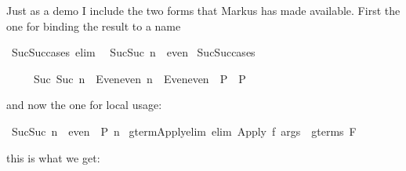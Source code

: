 \begin{isabellebody}
\begin{isamarkuptext}
Just as a demo I include
the two forms that Markus has made available. First the one for binding the
result to a name%
\end{isamarkuptext}%
\isamarkuptrue%
\ Suc{\isacharunderscore}Suc{\isacharunderscore}cases\ {\isacharbrackleft}elim{\isacharbang}{\isacharbrackright}{\isacharcolon}\isanewline
\ \ {\isachardoublequote}Suc{\isacharparenleft}Suc\ n{\isacharparenright}\ {\isasymin}\ even{\isachardoublequote}\isanewline
\isanewline
\isamarkupfalse%
\ Suc{\isacharunderscore}Suc{\isacharunderscore}cases\isamarkupfalse%
%
\begin{isamarkuptext}%
\begin{isabelle}%
\ \ \ \ \ {\isasymlbrakk}Suc\ {\isacharparenleft}Suc\ n{\isacharparenright}\ {\isasymin}\ Even{\isachardot}even{\isacharsemicolon}\ n\ {\isasymin}\ Even{\isachardot}even\ {\isasymLongrightarrow}\ P{\isasymrbrakk}\ {\isasymLongrightarrow}\ P%
\end{isabelle}

and now the one for local usage:%
\end{isamarkuptext}%
\isamarkuptrue%
\ {\isachardoublequote}Suc{\isacharparenleft}Suc\ n{\isacharparenright}\ {\isasymin}\ even\ {\isasymLongrightarrow}\ P\ n{\isachardoublequote}\isanewline
\isamarkupfalse%
\isamarkupfalse%
\isanewline
\isamarkupfalse%
\ gterm{\isacharunderscore}Apply{\isacharunderscore}elim\ {\isacharbrackleft}elim{\isacharbang}{\isacharbrackright}{\isacharcolon}\ {\isachardoublequote}Apply\ f\ args\ {\isasymin}\ gterms\ F{\isachardoublequote}\isamarkupfalse%
%
\begin{isamarkuptext}%
this is what we get:


\end{isamarkuptext}
\end{isabellebody}
